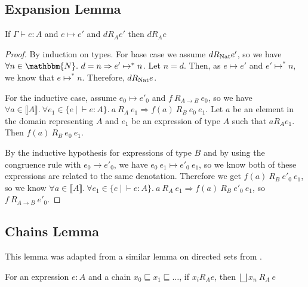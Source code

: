 \subsection{Expansion Lemma}\label{exp}

\vspace{0.25cm}

\begin{lem}\label{exp}
If $\Gamma \vdash e : A$ and $e \mapsto e'$ and $d R_A e'$ then $d R_A e$ 
\end{lem}

\begin{proof}
By induction on types. For base case we assume $d R_{\operatorname{Nat}} e'$, so we have $\forall n \in \mathbbm{N}. \ d = n \Rightarrow e' \mapsto^* n$. Let $n = d$. Then, as $e \mapsto e'$ and $e' \mapsto^* n$, we know that $e \mapsto^*n$. Therefore, $d R_{\operatorname{Nat}} e$.

For the inductive case, assume $e_0 \mapsto e'_0$ and $f \ R_{A \to B} \ e_0$, so we have $\forall a \in \llbracket A \rrbracket. \ \forall e_1 \in \{ e \ | \ \vdash e : A\}. \ a \ R_A \ e_1 \Rightarrow f(a) \ R_B \ e_0 \ e_1$. Let $a$ be an element in the domain representing $A$ and $e_1$ be an expression of type $A$ such that $a R_A e_1$. Then $f(a) \ R_B \ e_0 \ e_1$.

By the inductive hypothesis for expressions of type $B$  and by using the congruence rule with $e_0 \to e'_0$, we have $e_0 \ e_1 \mapsto e'_0 \ e_1$, so we know both of these expressions are related to the same denotation. Therefore we get $f(a) \ R_B \ e'_0 \ e_1$, so we know $\forall a \in \llbracket A \rrbracket. \ \forall e_1 \in \{ e \ | \ \vdash e : A\}. \ a \ R_A \ e_1 \Rightarrow f(a) \ R_B \ e'_0 \ e_1$, so $f \ R_{A \to B} \ e'_0$. 
\end{proof}

\subsection{Chains Lemma}

This lemma was adapted from a similar lemma on directed sets from \citep{Streicher06}.

\vspace{0.25cm}

\begin{lem}\label{chain}
For an expression $e : A$ and a  chain $x_0 \sqsubseteq x_1 \sqsubseteq \dots$, if $x_i R_A e$, then $\bigsqcup x_n \ R_A \ e$
\end{lem}

